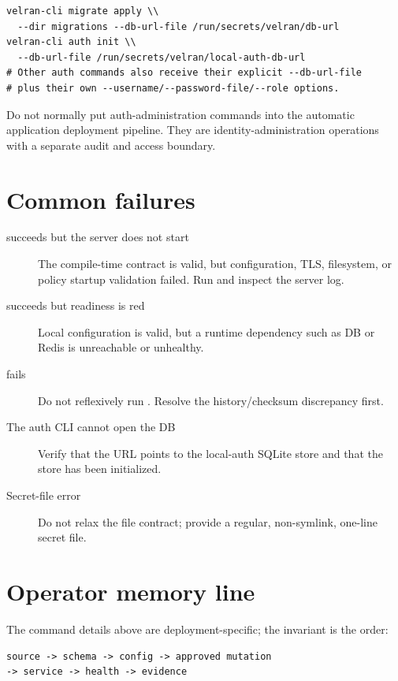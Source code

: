 \begin{lstlisting}
velran-cli migrate apply \\
  --dir migrations --db-url-file /run/secrets/velran/db-url
velran-cli auth init \\
  --db-url-file /run/secrets/velran/local-auth-db-url
# Other auth commands also receive their explicit --db-url-file
# plus their own --username/--password-file/--role options.
\end{lstlisting}

Do not normally put auth-administration commands into the automatic application deployment pipeline. They are identity-administration operations with a separate audit and access boundary.

\section{Common failures}

\begin{description}
  \item[ succeeds but the server does not start] The compile-time contract is valid, but configuration, TLS, filesystem, or policy startup validation failed. Run  and inspect the server log.
  \item[ succeeds but readiness is red] Local configuration is valid, but a runtime dependency such as DB or Redis is unreachable or unhealthy.
  \item[ fails] Do not reflexively run . Resolve the history/checksum discrepancy first.
  \item[The auth CLI cannot open the DB] Verify that the URL points to the local-auth SQLite store and that the store has been initialized.
  \item[Secret-file error] Do not relax the file contract; provide a regular, non-symlink, one-line secret file.
\end{description}

\section{Operator memory line}

The command details above are deployment-specific; the invariant is the order:

\begin{lstlisting}
source -> schema -> config -> approved mutation
-> service -> health -> evidence
\end{lstlisting}

